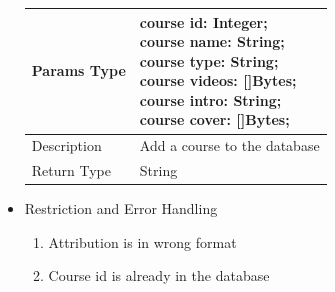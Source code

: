 \documentclass[16pt]{scrreprt}
\begin{document}
\begin{itemize}
\begin{center}
\begin{tabular}{p{5cm}p{10cm}}
        \hline
        Params Type & \makecell[l]{course id: Integer;\\course name: String;\\course type: String;\\course videos: []Bytes;\\course intro: String;\\course cover: []Bytes;\\}\\
        \hline
        Description & Add a course to the database\\
        \hline
        Return Type & String\\
        \hline
    \end{tabular}
\end{center}
\item Restriction and Error Handling\\
\begin{enumerate}
	\item Attribution is in wrong format
	\item Course id is already in the database
\end{enumerate} 
\end{itemize}
\end{document}
